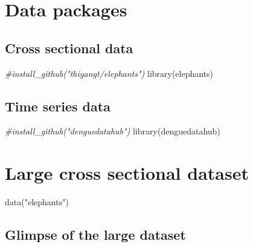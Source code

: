 \documentclass[
]{book}
\newenvironment{Shaded}{\begin{snugshade}}{\end{snugshade}}
\newcommand{\CommentTok}[1]{\textcolor[rgb]{0.56,0.35,0.01}{\textit{#1}}}
\newcommand{\FunctionTok}[1]{\textcolor[rgb]{0.00,0.00,0.00}{#1}}
\newcommand{\NormalTok}[1]{#1}
\newcommand{\StringTok}[1]{\textcolor[rgb]{0.31,0.60,0.02}{#1}}
\begin{document}
\hypertarget{data-packages}{%
\section{Data packages}\label{data-packages}}

\hypertarget{cross-sectional-data}{%
\subsection{Cross sectional data}\label{cross-sectional-data}}

\begin{Shaded}
\begin{Highlighting}[]
\CommentTok{\#install\_github("thiyangt/elephants")}
\FunctionTok{library}\NormalTok{(elephants)}
\end{Highlighting}
\end{Shaded}

\hypertarget{time-series-data}{%
\subsection{Time series data}\label{time-series-data}}

\begin{Shaded}
\begin{Highlighting}[]
\CommentTok{\#install\_github("denguedatahub")}
\FunctionTok{library}\NormalTok{(denguedatahub)}
\end{Highlighting}
\end{Shaded}

\hypertarget{large-cross-sectional-dataset}{%
\section{Large cross sectional dataset}\label{large-cross-sectional-dataset}}

\begin{Shaded}
\begin{Highlighting}[]
\FunctionTok{data}\NormalTok{(}\StringTok{"elephants"}\NormalTok{)}
\end{Highlighting}
\end{Shaded}

\hypertarget{glimpse-of-the-large-dataset}{%
\subsection{Glimpse of the large dataset}\label{glimpse-of-the-large-dataset}}
\end{document}
